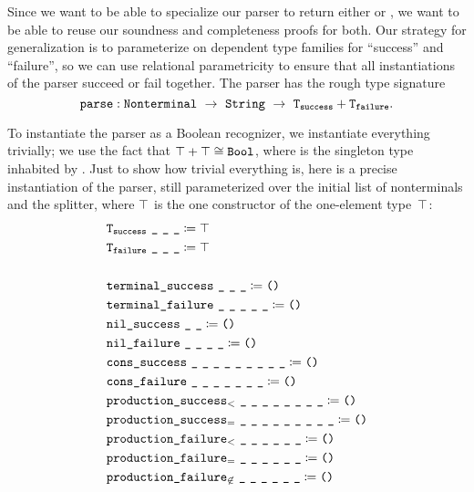   Since we want to be able to specialize our parser to return either \Bool\space or , we want to be able to reuse our soundness and completeness proofs for both.  Our strategy for generalization is to parameterize on dependent type families for ``success'' and ``failure'', so we can use relational parametricity to ensure that all instantiations of the parser succeed or fail together.  The parser has the rough type signature
  $$\oftype{\fname{parse}}{\Nonterminal~\typeto~\String~\typeto~\typesum{\fname{T$_{\fname{success}}$}}{\fname{T$_{\fname{failure}}$}}}.$$

  To instantiate the parser as a Boolean recognizer, we instantiate everything trivially; we use the fact that $\typesum{\Unit}{\Unit}\cong\Bool$, where \Unit\space is the singleton type inhabited by \unittt.  Just to show how trivial everything is, here is a precise instantiation of the parser, still parameterized over the initial list of nonterminals and the splitter, where $\top$ is the one constructor of the one-element type~$\top$:
  {\allowdisplaybreaks
  \begin{align*}
    & \texttt{T$_{\texttt{success}}$}~\texttt{\_}~\texttt{\_}~\texttt{\_} \coloneqq \top \\
    & \texttt{T$_{\texttt{failure}}$}~\texttt{\_}~\texttt{\_}~\texttt{\_} \coloneqq \top \\
    \\
    & \texttt{terminal\_success}~\texttt{\_}~\texttt{\_}~\texttt{\_} \coloneqq \texttt{()} \\
    & \texttt{terminal\_failure}~\texttt{\_}~\texttt{\_}~\texttt{\_}~\texttt{\_}~\texttt{\_} \coloneqq \texttt{()} \\
    & \texttt{nil\_success}~\texttt{\_}~\texttt{\_} \coloneqq \texttt{()} \\
    & \texttt{nil\_failure}~\texttt{\_}~\texttt{\_}~\texttt{\_}~\texttt{\_} \coloneqq \texttt{()} \\
    & \texttt{cons\_success}~\texttt{\_}~\texttt{\_}~\texttt{\_}~\texttt{\_}~\texttt{\_}~\texttt{\_}~\texttt{\_}~\texttt{\_}~\texttt{\_} \coloneqq \texttt{()} \\
    & \texttt{cons\_failure}~\texttt{\_}~\texttt{\_}~\texttt{\_}~\texttt{\_}~\texttt{\_}~\texttt{\_}~\texttt{\_} \coloneqq \texttt{()} \\
    & \texttt{production\_success$_<$}~\texttt{\_}~\texttt{\_}~\texttt{\_}~\texttt{\_}~\texttt{\_}~\texttt{\_}~\texttt{\_}~\texttt{\_} \coloneqq \texttt{()} \\
    & \texttt{production\_success$_=$}~\texttt{\_}~\texttt{\_}~\texttt{\_}~\texttt{\_}~\texttt{\_}~\texttt{\_}~\texttt{\_}~\texttt{\_}~\texttt{\_} \coloneqq \texttt{()} \\
    & \texttt{production\_failure$_<$}~\texttt{\_}~\texttt{\_}~\texttt{\_}~\texttt{\_}~\texttt{\_}~\texttt{\_} \coloneqq \texttt{()} \\
    & \texttt{production\_failure$_=$}~\texttt{\_}~\texttt{\_}~\texttt{\_}~\texttt{\_}~\texttt{\_}~\texttt{\_} \coloneqq \texttt{()} \\
    & \texttt{production\_failure$_{\not\in}$}~\texttt{\_}~\texttt{\_}~\texttt{\_}~\texttt{\_}~\texttt{\_}~\texttt{\_} \coloneqq \texttt{()}
  \end{align*}}
